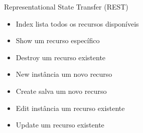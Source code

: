\begin{frame}[t, fragile]{Representational State Transfer (REST)}
	\begin{itemize}
		\item \alert{Index} lista todos os recursos disponíveis
		\item \alert{Show} um recurso específico
		\item \alert{Destroy} um recurso existente
		\item \alert{New} instância um novo recurso
		\item \alert{Create} salva um novo recurso
		\item \alert{Edit} instância um recurso existente
		\item \alert{Update} um recurso existente
	\end{itemize}		
\end{frame}